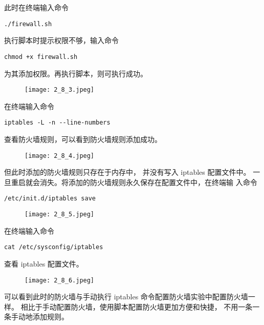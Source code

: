 此时在终端输入命令
\begin{verbatim}
./firewall.sh
\end{verbatim}
执行脚本时提示权限不够，输入命令
\begin{verbatim}
chmod +x firewall.sh
\end{verbatim}
为其添加权限。再执行脚本，则可执行成功。
\begin{figure}[H]
  \begin{center}
    \texttt{[image: 2\_8\_3.jpeg]}
  \end{center}
\end{figure}

在终端输入命令
\begin{verbatim}
iptables -L -n --line-numbers
\end{verbatim}
查看防火墙规则，可以看到防火墙规则添加成功。
\begin{figure}[H]
  \begin{center}
    \texttt{[image: 2\_8\_4.jpeg]}
  \end{center}
\end{figure}

但此时添加的防火墙规则只存在于内存中，
并没有写入 iptables 配置文件中。
一旦重启就会消失。将添加的防火墙规则永久保存在配置文件中，在终端输
入命令
\begin{verbatim}
/etc/init.d/iptables save
\end{verbatim}
\begin{figure}[H]
  \begin{center}
    \texttt{[image: 2\_8\_5.jpeg]}
  \end{center}
\end{figure}

在终端输入命令
\begin{verbatim}
cat /etc/sysconfig/iptables
\end{verbatim}
查看 iptables 配置文件。
\begin{figure}[H]
  \begin{center}
    \texttt{[image: 2\_8\_6.jpeg]}
  \end{center}
\end{figure}

可以看到此时的防火墙与手动执行 iptables
命令配置防火墙实验中配置防火墙一样。
相比于手动配置防火墙，使用脚本配置防火墙更加方便和快捷，
不用一条一条手动地添加规则。
